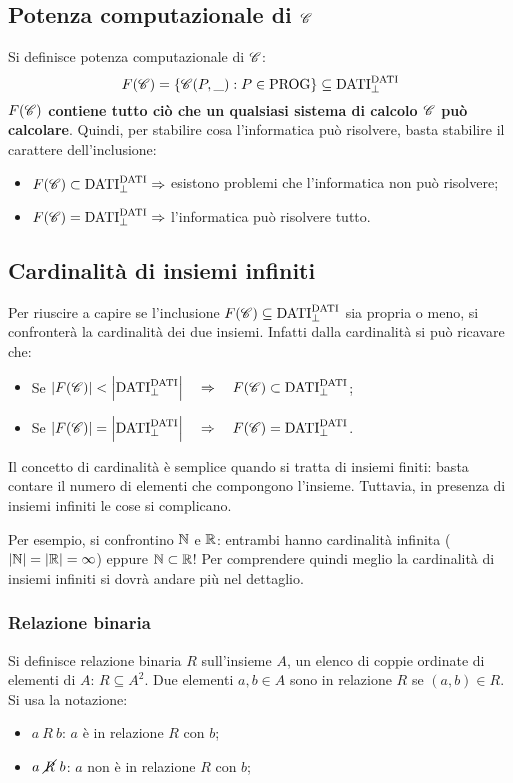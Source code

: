 \subsection{Potenza computazionale di \texorpdfstring{$\mathscr{C}$}{C}
\label{sec:pot_comp}}
Si definisce potenza computazionale di $\mathscr{C}$:
$$ F(\mathscr{C}) = \{\mathscr{C}(P,\_):P\in\text{PROG}\} \subseteq \text{DATI}^{\text{DATI}}_\perp $$
\textbf{$F(\mathscr{C})$ contiene tutto ciò che un qualsiasi sistema di calcolo $\mathscr{C}$
può calcolare}. Quindi, per stabilire cosa l'informatica può risolvere, basta stabilire
il carattere dell'inclusione:
\begin{itemize}
    \item $F(\mathscr{C})\subset\text{DATI}^{\text{DATI}}_\perp \Rightarrow $
        esistono problemi che l'informatica non può risolvere;
    \item $F(\mathscr{C})=\text{DATI}^{\text{DATI}}_\perp \Rightarrow $
        l'informatica può risolvere tutto.
\end{itemize}

\subsection{Cardinalità di insiemi infiniti}
Per riuscire a capire se l'inclusione
$F(\mathscr{C})\subseteq\text{DATI}^{\text{DATI}}_\perp$ sia propria o meno, si confronterà
la cardinalità dei due insiemi. Infatti dalla cardinalità si può ricavare che:
\begin{itemize}
    \item Se $|F(\mathscr{C})|<\left|\text{DATI}^{\text{DATI}}_\perp\right|
    \quad \Rightarrow \quad F(\mathscr{C})\subset\text{DATI}^{\text{DATI}}_\perp$;
    \item Se $|F(\mathscr{C})|=\left|\text{DATI}^{\text{DATI}}_\perp\right|
    \quad \Rightarrow \quad F(\mathscr{C})=\text{DATI}^{\text{DATI}}_\perp$.
\end{itemize}

Il concetto di cardinalità è semplice quando si tratta di insiemi finiti: basta
contare il numero di elementi che compongono l'insieme. Tuttavia, in presenza
di insiemi infiniti le cose si complicano.

Per esempio, si confrontino $\mathbb{N}$ e $\mathbb{R}$: entrambi hanno cardinalità infinita
($|\mathbb{N}|=|\mathbb{R}|=\infty$) eppure $\mathbb{N}\subset\mathbb{R}$! Per comprendere quindi meglio
la cardinalità di insiemi infiniti si dovrà andare più nel dettaglio.

\subsubsection{Relazione binaria}
Si definisce relazione binaria $R$ sull'insieme $A$, un elenco di coppie ordinate
di elementi di $A$: $R\subseteq A^2$. Due elementi $a,b\in A$ sono in relazione 
$R$ se $(a,b)\in R$. Si usa la notazione:
\begin{itemize}
    \item $a \ R \ b$: $a$ è in relazione $R$ con $b$;
    \item $a\ \cancel{R} \ b$: $a$ non è in relazione $R$ con $b$;
\end{itemize}

